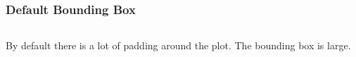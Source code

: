 \documentclass[xcolor={svgnames}]{beamer}
\newcommand{\pyfile}[2][]{}
\begin{document}
\begin{frame}[fragile]
    \frametitle{Default Bounding Box}
    \begin{columns}
        \begin{column}{0.52\textwidth}
            \pyfile[linerange={1-3,5-5}]{examples/01-savefig.py}
        \end{column}
        \begin{column}{0.48\textwidth}
        \end{column}
    \end{columns}
    \small
    \vspace{15mm}
    \hspace{-1.97mm}
    By default there is a lot of padding around the plot. The bounding
    box is large.
\end{frame}
\end{document}
